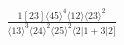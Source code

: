\documentclass[varwidth, border=5pt]{standalone}
\begin{document}
\begin{my}
$\begin{gathered}
\scriptscriptstyle\frac{1[23]⟨45⟩^4⟨12⟩⟨23⟩^2}{⟨13⟩^3⟨24⟩^2⟨25⟩^2⟨2|1+3|2]}
\end{gathered}$
\end{my}
\end{document}

